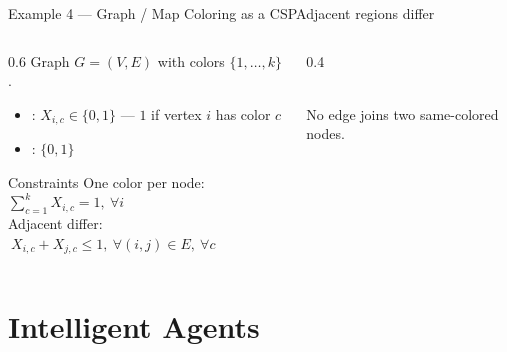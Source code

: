 \documentclass[aspectratio=169,11pt]{beamer}
\begin{document}
\begin{frame}{Example 4 — Graph / Map Coloring as a CSP}{Adjacent regions differ}
  \begin{columns}[T]
    \begin{column}{0.6\textwidth}
      Graph $G=(V,E)$ with colors $\{1,\dots,k\}$.
      \begin{itemize}\small
        \item {}: $X_{i,c}\in\{0,1\}$ — $1$ if vertex $i$ has color $c$
        \item {}: $\{0,1\}$
      \end{itemize}
      \begin{block}{Constraints}
        \footnotesize
        One color per node: $\displaystyle\sum_{c=1}^{k} X_{i,c}=1,\ \forall i$ \\[0.3em]
        Adjacent differ: $\ X_{i,c}+X_{j,c}\le 1,\ \forall (i,j)\in E,\ \forall c$
      \end{block}
    \end{column}
    \begin{column}{0.4\textwidth}
      \begin{center}
      \\[0.3em]
      \scriptsize No edge joins two same-colored nodes.
      \end{center}
    \end{column}
  \end{columns}
\end{frame}

\section{Intelligent Agents}
\end{document}
